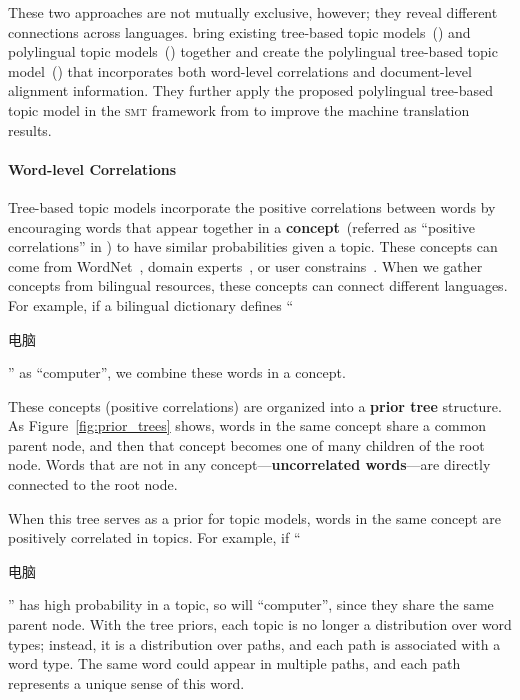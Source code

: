 These two approaches are not mutually exclusive, however; they reveal different connections across languages. \citet{hu-14} bring existing tree-based topic models~(\tlda{}) and polylingual topic models~(\plda{}) together and create the polylingual tree-based topic model~(\ptlda{}) that incorporates both word-level correlations and document-level alignment information. They further apply the proposed polylingual tree-based topic model in the \textsc{smt} framework from \citet{Eidelman-12} to improve the machine translation results.

\paragraph{\bf Word-level Correlations}

Tree-based topic models incorporate the positive correlations between words by encouraging words that appear together in a {\bf concept}~(referred as ``positive correlations'' in \citet{andrzejewski-09,Hu:Boyd-Graber:Satinoff-ur}) to have similar probabilities given a topic. These concepts can come from WordNet~\citep{boyd-graber-10}, domain experts~\citep{andrzejewski-09}, or user constrains~\citep{Hu:Boyd-Graber:Satinoff-ur}. When we gather concepts from bilingual resources, these concepts can connect different languages.  For example, if a bilingual dictionary defines ``\begin{CJK*}{UTF8}{gbsn}电脑\end{CJK*}'' as ``computer'', we combine these words in a concept.


These concepts (positive correlations) are organized into a {\bf prior tree} structure. As Figure~\ref{fig:prior_trees} shows, words in the same concept share a common parent node, and then that concept becomes one of many children of the root node.  Words that are not in any concept---{\bf uncorrelated words}---are directly connected to the root node.

When this tree serves as a prior for topic models, words in the same concept are positively correlated in topics.
For example, if ``\begin{CJK*}{UTF8}{gbsn}电脑\end{CJK*}'' has high probability in a topic, so will ``computer'', since they share the same parent node. With the tree priors, each topic is no longer a distribution over word types; instead, it is a distribution over paths, and each path is
associated with a word type.  The same word could appear in multiple paths, and each path represents a unique sense of this word.

